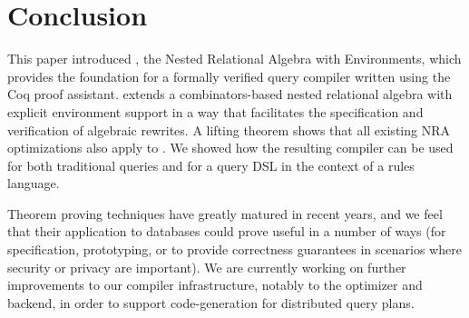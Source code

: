 \section{Conclusion}
\label{sec:conclusion}

This paper introduced \NRAEnv, the Nested Relational Algebra with
Environments, which provides the foundation for a formally verified
query compiler written using the Coq proof assistant. \NRAEnv extends
a combinators-based nested relational algebra with explicit
environment support in a way that facilitates the specification and
verification of algebraic rewrites. A lifting theorem shows that all
existing NRA optimizations also apply to \NRAEnv. We showed how the
resulting compiler can be used for both traditional queries and for a
query DSL in the context of a rules language. 

Theorem proving techniques have greatly matured in recent years, and
we feel that their application to databases could prove useful in a number
of ways (for specification, prototyping, or to provide correctness
guarantees in scenarios where security or privacy are important). We
are currently working on further improvements to our compiler
infrastructure, notably to the optimizer and backend, in order to
support code-generation for distributed query plans.


